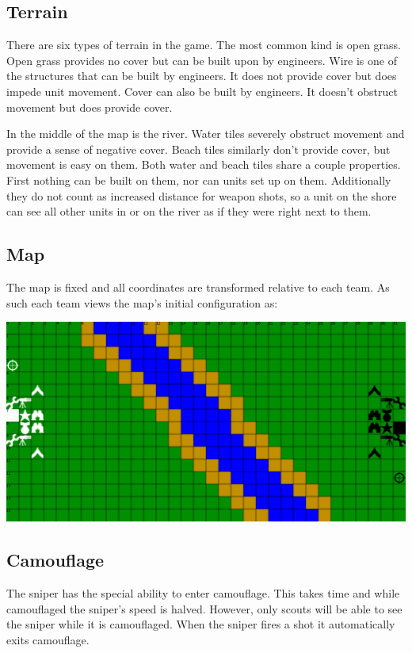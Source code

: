 \documentclass{article}
\begin{document}
\subsection{Terrain}

There are six types of terrain in the game. The most common kind is open grass.
Open grass provides no cover but can be built upon by engineers. Wire is one of
the structures that can be built by engineers. It does not provide cover but
does impede unit movement. Cover can also be built by engineers. It doesn't
obstruct movement but does provide cover.

In the middle of the map is the river. Water tiles severely obstruct movement
and provide a sense of negative cover. Beach tiles similarly don't provide
cover, but movement is easy on them. Both water and beach tiles share a couple
properties. First nothing can be built on them, nor can units set up on them.
Additionally they do not count as increased distance for weapon shots, so a unit
on the shore can see all other units in or on the river as if they were right
next to them.

\subsection{Map}

The map is fixed and all coordinates are transformed relative to each team. As
such each team views the map's initial configuration as:

{\centering\includegraphics[width=\textwidth]{res/map.png}\par}

\subsection{Camouflage}

The sniper has the special ability to enter camouflage. This takes time and
while camouflaged the sniper's speed is halved. However, only scouts will be
able to see the sniper while it is camouflaged. When the sniper fires a shot it
automatically exits camouflage.
\end{document}
